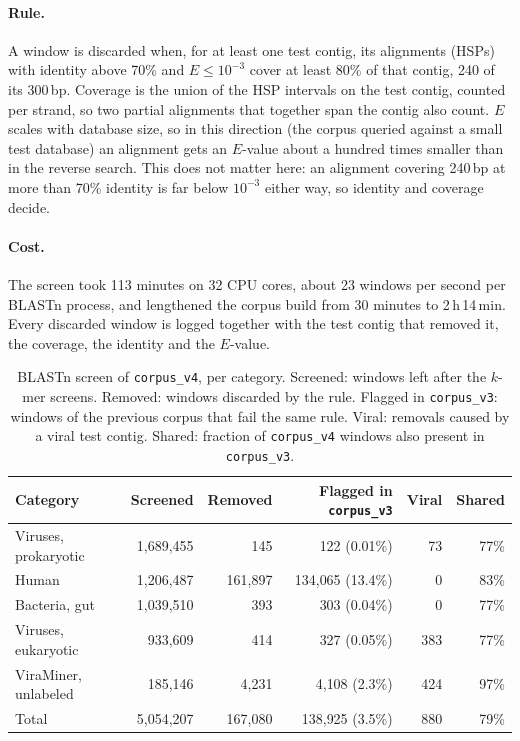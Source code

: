 \documentclass[10pt,twocolumn,a4paper]{article}
\begin{document}
\paragraph{Rule.} A window is discarded when, for at least one test contig, its
alignments (HSPs) with identity above 70\% and $E \le 10^{-3}$ cover at least 80\%
of that contig, 240 of its 300\,bp. Coverage is the union of the HSP intervals on
the test contig, counted per strand, so two partial alignments that together span
the contig also count. $E$ scales with database size, so in this direction (the
corpus queried against a small test database) an alignment gets an $E$-value
about a hundred times smaller than in the reverse search. This does not matter
here: an alignment covering 240\,bp at more than 70\% identity is far below
$10^{-3}$ either way, so identity and coverage decide.

\paragraph{Cost.} The screen took 113 minutes on 32 CPU cores, about 23 windows
per second per BLASTn process, and lengthened the corpus build from 30 minutes to
2\,h\,14\,min. Every discarded window is logged together with the test contig that
removed it, the coverage, the identity and the $E$-value.

\begin{table}[t]
\centering
\caption{BLASTn screen of \texttt{corpus\_v4}, per category. Screened: windows
left after the $k$-mer screens. Removed: windows discarded by the rule. Flagged in
\texttt{corpus\_v3}: windows of the previous corpus that fail the same rule.
Viral: removals caused by a viral test contig. Shared: fraction of
\texttt{corpus\_v4} windows also present in \texttt{corpus\_v3}.}
\label{tab:blast}
\small
\begin{tabular}{lrrrrr}
\toprule
Category & Screened & Removed & Flagged in \texttt{corpus\_v3} & Viral & Shared \\
\midrule
Viruses, prokaryotic & 1{,}689{,}455 &     145 &     122 (0.01\%) &  73 & 77\% \\
Human                & 1{,}206{,}487 & 161{,}897 & 134{,}065 (13.4\%) &   0 & 83\% \\
Bacteria, gut        & 1{,}039{,}510 &     393 &     303 (0.04\%) &   0 & 77\% \\
Viruses, eukaryotic  &   933{,}609 &     414 &     327 (0.05\%) & 383 & 77\% \\
ViraMiner, unlabeled &   185{,}146 &   4{,}231 &   4{,}108 (2.3\%)  & 424 & 97\% \\
\midrule
Total                & 5{,}054{,}207 & 167{,}080 & 138{,}925 (3.5\%) & 880 & 79\% \\
\bottomrule
\end{tabular}
\end{table}
\end{document}
